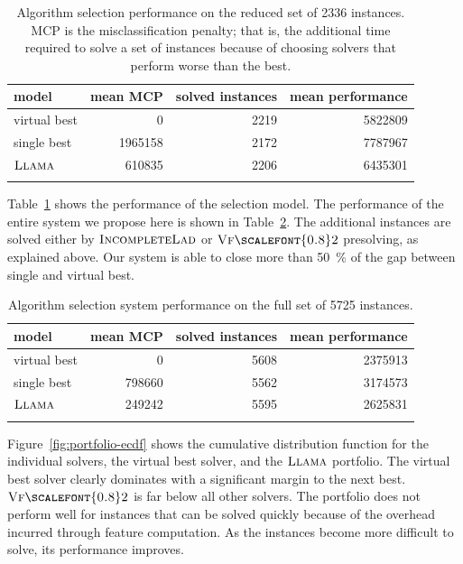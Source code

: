 \documentclass{llncs}
\newcommand{\VFtwo}{$\textsc{Vf{\scalefont{0.8}2}}$\xspace}
\newcommand{\IncompleteLAD}{$\textsc{IncompleteLad}$\xspace}
\newcommand{\LLAMA}{$\textsc{Llama}$\xspace}
\begin{document}
\begin{table}[ht]
    \centering\setlength{\tabcolsep}{1em}
\begin{tabular}{lrrr}
  \toprule
model & mean MCP & solved instances & mean performance\\
  \midrule
virtual best & 0 & 2219 & 5822809\\
single best & 1965158 & 2172 & 7787967\\
\LLAMA & 610835 & 2206 & 6435301\\
   \bottomrule \\
\end{tabular}
\caption{Algorithm selection performance on the reduced set of 2336
instances. MCP is the misclassification penalty; that is, the additional time
required to solve a set of instances because of choosing solvers that perform
worse than the best.}\label{tab:res} \end{table}

Table~\ref{tab:res} shows the performance of the selection model. The performance of the entire
system we propose here is shown in Table~\ref{tab:resfull}. The additional instances are solved
either by \IncompleteLAD or \VFtwo presolving, as explained above. Our system is able to close more than
\SI{50}{\percent} of the gap between single and virtual best.

\begin{table}[ht]
    \centering\setlength{\tabcolsep}{1em}
\begin{tabular}{lrrr}
  \toprule
model & mean MCP & solved instances & mean performance\\
  \midrule
virtual best & 0 & 5608 & 2375913\\
single best & 798660 & 5562 & 3174573\\
\LLAMA & 249242 & 5595 & 2625831\\
   \bottomrule \\
\end{tabular}
\caption{Algorithm selection system performance on the full set of 5725
instances.}\label{tab:resfull}
\end{table}

Figure~\ref{fig:portfolio-ecdf} shows the cumulative distribution function for
the individual solvers, the virtual best solver, and the \LLAMA portfolio. The
virtual best solver clearly dominates with a significant margin to the next
best. \VFtwo is far below all other solvers. The portfolio does not perform well
for instances that can be solved quickly because of the overhead incurred
through feature computation. As the instances become more difficult to solve,
its performance improves.
\end{document}
